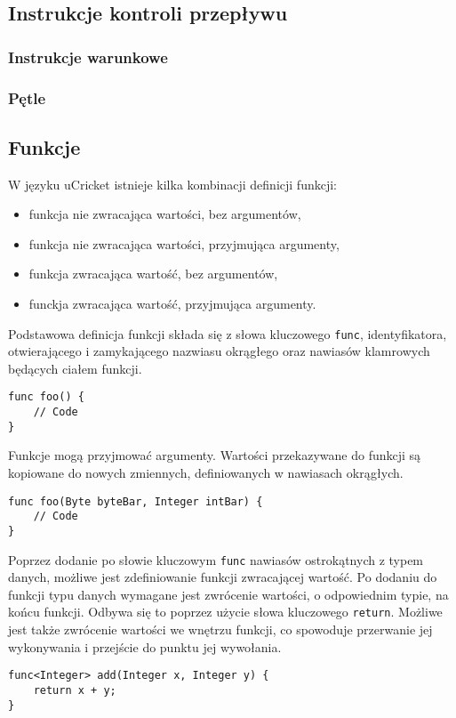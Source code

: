 \subsection{Instrukcje kontroli przepływu}
\subsubsection{Instrukcje warunkowe}
\subsubsection{Pętle}

\subsection{Funkcje}
W języku uCricket istnieje kilka kombinacji definicji funkcji:
\begin{itemize}
\item funkcja nie zwracająca wartości, bez argumentów,
\item funkcja nie zwracająca wartości, przyjmująca argumenty,
\item funkcja zwracająca wartość, bez argumentów,
\item funckja zwracająca wartość, przyjmująca argumenty. 
\end{itemize}

Podstawowa definicja funkcji składa się z słowa kluczowego \lstinline|func|, identyfikatora, otwierającego i zamykającego nazwiasu okrągłego oraz nawiasów klamrowych będących ciałem funkcji.
\begin{lstlisting}
func foo() {
	// Code
}
\end{lstlisting}

Funkcje mogą przyjmować argumenty. Wartości przekazywane do funkcji są kopiowane do nowych zmiennych, definiowanych w nawiasach okrągłych.
\begin{lstlisting}
func foo(Byte byteBar, Integer intBar) {
	// Code
}
\end{lstlisting}

Poprzez dodanie po słowie kluczowym \lstinline|func| nawiasów ostrokątnych z typem danych, możliwe jest zdefiniowanie funkcji zwracającej wartość. Po dodaniu do funkcji typu danych wymagane jest zwrócenie wartości, o odpowiednim typie, na końcu funkcji. Odbywa się to poprzez użycie słowa kluczowego \lstinline|return|. Możliwe jest także zwrócenie wartości we wnętrzu funkcji, co spowoduje przerwanie jej wykonywania i przejście do punktu jej wywołania.
\begin{lstlisting}
func<Integer> add(Integer x, Integer y) {
	return x + y;
}
\end{lstlisting}
